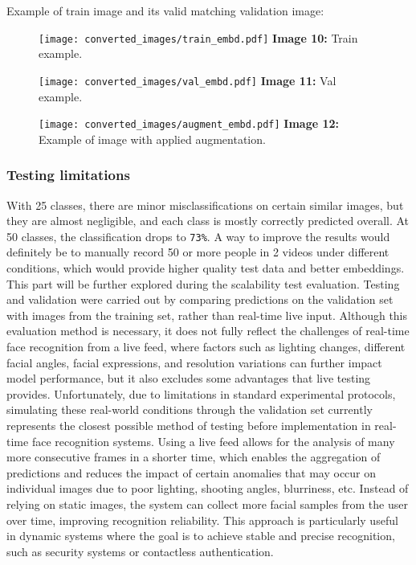 \documentclass{article}
\begin{document}
Example of train image and its valid matching validation image:
\begin{figure}[H]
    \centering
    \texttt{[image: converted\_images/train\_embd.pdf]}
    \textbf{Image 10:} Train example.
\end{figure}
\begin{figure}[H]
    \centering
    \texttt{[image: converted\_images/val\_embd.pdf]}
    \textbf{Image 11:} Val example.
\end{figure}

\begin{figure}[H]
    \centering
    \texttt{[image: converted\_images/augment\_embd.pdf]}
    \textbf{Image 12:} Example of image with applied augmentation.
\end{figure}

\subsubsection*{Testing limitations}

\hspace*{1.00cm}With 25 classes, there are minor misclassifications on certain similar images, but they are almost negligible, and each class is mostly correctly predicted overall. At 50 classes, the classification drops to \texttt{73\%}. A way to improve the results would definitely be to manually record 50 or more people in 2 videos under different conditions, which would provide higher quality test data and better embeddings. This part will be further explored during the scalability test evaluation.
Testing and validation were carried out by comparing predictions on the validation set with images from the training set, rather than real-time live input. Although this evaluation method is necessary, it does not fully reflect the challenges of real-time face recognition from a live feed, where factors such as lighting changes, different facial angles, facial expressions, and resolution variations can further impact model performance, but it also excludes some advantages that live testing provides. Unfortunately, due to limitations in standard experimental protocols, simulating these real-world conditions through the validation set currently represents the closest possible method of testing before implementation in real-time face recognition systems. Using a live feed allows for the analysis of many more consecutive frames in a shorter time, which enables the aggregation of predictions and reduces the impact of certain anomalies that may occur on individual images due to poor lighting, shooting angles, blurriness, etc. Instead of relying on static images, the system can collect more facial samples from the user over time, improving recognition reliability. This approach is particularly useful in dynamic systems where the goal is to achieve stable and precise recognition, such as security systems or contactless authentication.
\end{document}
